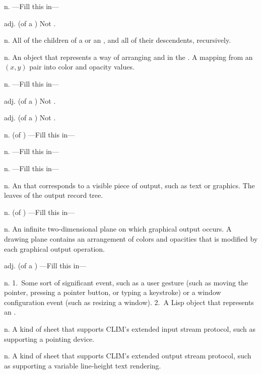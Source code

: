 \begin{description}
 {n.} {---Fill this in---}

 {adj.} {(of a ) Not .}

 {n.} {All of the children of a  or an
, and all of their descendents, recursively.}

 {n.} {An object that represents a way of arranging
 and  in the .  A mapping from
an $(x,y)$ pair into color and opacity values.}

 {n.} {---Fill this in---}

 {adj.} {(of a ) Not .}

 {adj.} {(of a ) Not .} 

 {n.} {(of ) ---Fill this in---}

 {n.} {---Fill this in---}

 {n.} {---Fill this in---}

 {n.} {An  that
corresponds to a visible piece of output, such as text or graphics.  The leaves
of the output record tree.}

 {n.} {(of ) ---Fill this in---}

 {n.} {An infinite two-dimensional plane on which
graphical output occurs.  A drawing plane contains an arrangement of colors and
opacities that is modified by each graphical output operation.}

 {adj.} {(of a ) ---Fill this in---}

 {n.} {1.~Some sort of significant event, such as a user
gesture (such as moving the pointer, pressing a pointer button, or typing a
keystroke) or a window configuration event (such as resizing a window).  2.~A
Lisp object that represents an .}

 {n.} {A kind of sheet that supports
CLIM's extended input stream protocol, such as supporting a pointing device.}

 {n.} {A kind of sheet that supports
CLIM's extended output stream protocol, such as supporting a variable
line-height text rendering.}


\end{description}
